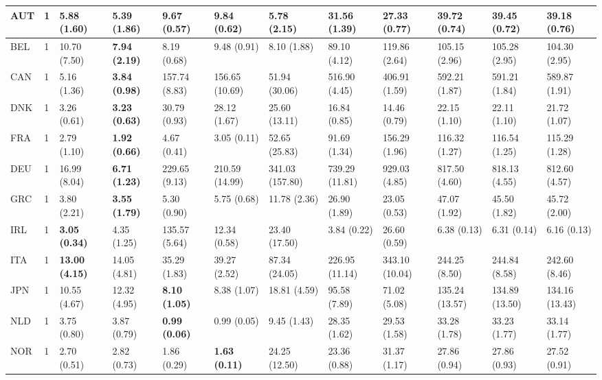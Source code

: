\begin{tabular}[t]{|*1{p{8mm}|}|*1{p{8mm}}||*4{p{10mm}|}*1{p{10mm}|}*5{p{10mm}|}}
\hline

\hhline{|=||=||=|=|=|=|=|=|=|=|=|=|}
AUT & 1 & 5.88 (1.60) & \textbf{5.39 (1.86)} & 9.67 (0.57) & 9.84 (0.62) & 5.78 (2.15) & 31.56 (1.39) & 27.33 (0.77) & 39.72 (0.74) & 39.45 (0.72) & 39.18 (0.76)\\
\hline
BEL & 1 & 10.70 (7.50) & \textbf{7.94 (2.19)} & 8.19 (0.68) & 9.48 (0.91) & 8.10 (1.88) & 89.10 (4.12) & 119.86 (2.64) & 105.15 (2.96) & 105.28 (2.95) & 104.30 (2.95)\\
\hline
CAN & 1 & 5.16 (1.36) & \textbf{3.84 (0.98)} & 157.74 (8.83) & 156.65 (10.69) & 51.94 (30.06) & 516.90 (4.45) & 406.91 (1.59) & 592.21 (1.87) & 591.21 (1.84) & 589.87 (1.91)\\
\hline
DNK & 1 & 3.26 (0.61) & \textbf{3.23 (0.63)} & 30.79 (0.93) & 28.12 (1.67) & 25.60 (13.11) & 16.84 (0.85) & 14.46 (0.79) & 22.15 (1.10) & 22.11 (1.10) & 21.72 (1.07)\\
\hline
FRA & 1 & 2.79 (1.10) & \textbf{1.92 (0.66)} & 4.67 (0.41) & 3.05 (0.11) & 52.65 (25.83) & 91.69 (1.34) & 156.29 (1.96) & 116.32 (1.27) & 116.54 (1.25) & 115.29 (1.28)\\
\hline
DEU & 1 & 16.99 (8.04) & \textbf{6.71 (1.23)} & 229.65 (9.13) & 210.59 (14.99) & 341.03 (157.80) & 739.29 (11.81) & 929.03 (4.85) & 817.50 (4.60) & 818.13 (4.55) & 812.60 (4.57)\\
\hline
GRC & 1 & 3.80 (2.21) & \textbf{3.55 (1.79)} & 5.30 (0.90) & 5.75 (0.68) & 11.78 (2.36) & 26.90 (1.89) & 23.05 (0.53) & 47.07 (1.92) & 45.50 (1.82) & 45.72 (2.00)\\
\hline
IRL & 1 & \textbf{3.05 (0.34)} & 4.35 (1.25) & 135.57 (5.64) & 12.34 (0.58) & 23.40 (17.50) & 3.84 (0.22) & 26.60 (0.59) & 6.38 (0.13) & 6.31 (0.14) & 6.16 (0.13)\\
\hline
ITA & 1 & \textbf{13.00 (4.15)} & 14.05 (4.81) & 35.29 (1.83) & 39.27 (2.52) & 87.34 (24.05) & 226.95 (11.14) & 343.10 (10.04) & 244.25 (8.50) & 244.84 (8.58) & 242.60 (8.46)\\
\hline
JPN & 1 & 10.55 (4.67) & 12.32 (4.95) & \textbf{8.10 (1.05)} & 8.38 (1.07) & 18.81 (4.59) & 95.58 (7.89) & 71.02 (5.08) & 135.24 (13.57) & 134.89 (13.50) & 134.16 (13.43)\\
\hline
NLD & 1 & 3.75 (0.80) & 3.87 (0.79) & \textbf{0.99 (0.06)} & 0.99 (0.05) & 9.45 (1.43) & 28.35 (1.62) & 29.53 (1.58) & 33.28 (1.78) & 33.23 (1.77) & 33.14 (1.77)\\
\hline
NOR & 1 & 2.70 (0.51) & 2.82 (0.73) & 1.86 (0.29) & \textbf{1.63 (0.11)} & 24.25 (12.50) & 23.36 (0.88) & 31.37 (1.17) & 27.86 (0.94) & 27.86 (0.93) & 27.52 (0.91)\\

\end{tabular}
